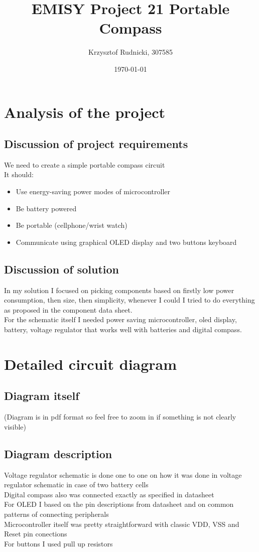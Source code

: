 \documentclass{article}
\title{EMISY Project 21 Portable Compass}
\author{Krzysztof Rudnicki, 307585}
\date{\today}
\begin{document}

\maketitle
\section{Analysis of the project}
\subsection{Discussion of project requirements}
We need to create a simple portable compass circuit \\
It should:
\begin{itemize}
	\item Use energy-saving power modes of microcontroller
	\item Be battery powered
	\item Be portable (cellphone/wrist watch)
	\item Communicate using graphical OLED display and two buttons keyboard
\end{itemize}
\subsection{Discussion of solution}
In my solution I focused on picking components based on firstly low power
consumption, then size, then simplicity, whenever I could I tried to do
everything as proposed in the component data sheet. \\
For the schematic itself I needed power saving microcontroller, oled display,
battery, voltage regulator that works well with batteries and digital compass.
\section{Detailed circuit diagram}
\subsection{Diagram itself}
(Diagram is in pdf format so feel free to zoom in if something is not clearly
visible) 

\subsection{Diagram description}
Voltage regulator schematic is done one to one on how it was done in voltage
regulator schematic in case of two battery cells \\ 
Digital compass also was connected exactly as specified in datasheet \\
For OLED I based on the pin descriptions from datasheet and on common patterns
of connecting peripherals \\
Microcontroller itself was pretty straightforward with classic VDD, VSS and
Reset pin conections \\
For buttons I used pull up resistors 
\newpage
\end{document}
